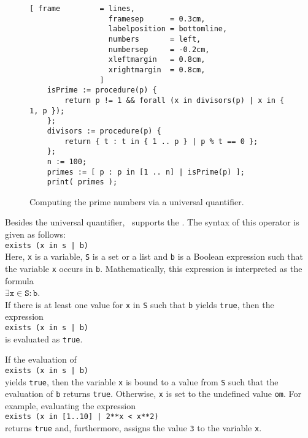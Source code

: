 \begin{figure}[!ht]
\centering
\begin{Verbatim}[ frame         = lines, 
                  framesep      = 0.3cm, 
                  labelposition = bottomline,
                  numbers       = left,
                  numbersep     = -0.2cm,
                  xleftmargin   = 0.8cm,
                  xrightmargin  = 0.8cm,
                ]
    isPrime := procedure(p) {
        return p != 1 && forall (x in divisors(p) | x in { 1, p });
    };
    divisors := procedure(p) {
        return { t : t in { 1 .. p } | p % t == 0 };
    };
    n := 100;
    primes := [ p : p in [1 .. n] | isPrime(p) ];
    print( primes );
\end{Verbatim}
\vspace*{-0.3cm}
\caption{Computing the prime numbers via a universal quantifier.}
\label{fig:primes-forall.stlx}
\end{figure}

Besides the universal quantifier, \setlx\ supports the .  The syntax of this operator is
given as follows: 
\\[0.2cm]
\hspace*{1.3cm}
\texttt{exists (x in s | b)}
\\[0.2cm]
Here, \texttt{x} is a variable, \texttt{S} is a set or a list and \texttt{b} is a Boolean expression such
that the variable \texttt{x} occurs in \texttt{b}.  Mathematically, this expression is interpreted
as the formula
\\[0.2cm]
\hspace*{1.3cm}
$\exists \mathtt{x} \in \mathtt{S} : \mathtt{b}$.
\\[0.2cm]
If there is at least one value for \texttt{x} in \texttt{S} such that \texttt{b} yields \texttt{true}, 
then the expression 
\\[0.2cm]
\hspace*{1.3cm}
\texttt{exists (x in s | b)}
\\[0.2cm]
is evaluated as \texttt{true}. 

\remarkEng
If the evaluation of
\\[0.2cm]
\hspace*{1.3cm}
\texttt{exists (x in s | b)}
\\[0.2cm]
yields \texttt{true}, then the variable \texttt{x} is bound to a value from \texttt{S} such that the
evaluation of \texttt{b} returns \texttt{true}.  Otherwise, \texttt{x} is set to the undefined value
\texttt{om}.  For example, evaluating the expression
\\[0.2cm]
\hspace*{1.3cm}
\texttt{exists (x in [1..10] | 2**x < x**2)}
\\[0.2cm]
returns \texttt{true} and, furthermore, assigns the value \texttt{3} to the variable \texttt{x}.

